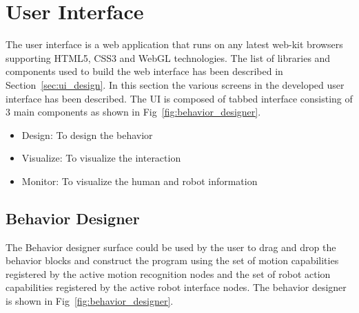 \section{User Interface}
\label{ssec:ui_comp}
The user interface is a web application that runs on any latest web-kit browsers supporting HTML5, CSS3 and WebGL technologies. The list of libraries and components used to build the web interface has been described in Section~\ref{sec:ui_design}. In this section the various screens in the developed user interface has been described. The UI is composed of tabbed interface consisting of 3 main components as shown in Fig~\ref{fig:behavior_designer}.
\begin{itemize}
\item Design: To design the behavior
\item Visualize: To visualize the interaction
\item Monitor: To visualize the human and robot information
\end{itemize}

\subsection{Behavior Designer} The Behavior designer surface could be used by the user to drag and drop the behavior blocks and construct the program using the set of motion capabilities registered by the active motion recognition nodes and the set of robot action capabilities registered by the active robot interface nodes. The behavior designer is shown in Fig~\ref{fig:behavior_designer}.

